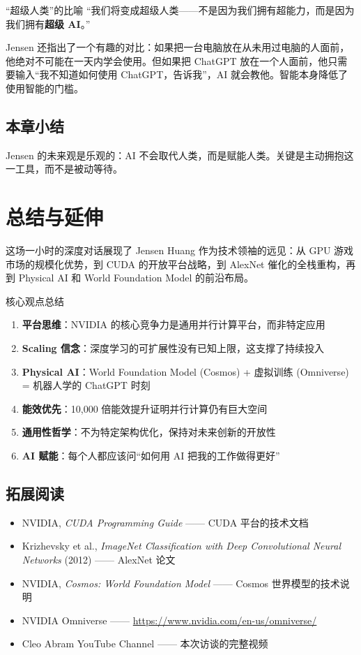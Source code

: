 \documentclass[a4paper]{article}
\begin{document}
\begin{knowledgebox}{``超级人类''的比喻}
``我们将变成超级人类——不是因为我们拥有超能力，而是因为我们拥有\textbf{超级 AI}。''

Jensen 还指出了一个有趣的对比：如果把一台电脑放在从未用过电脑的人面前，他绝对不可能在一天内学会使用。但如果把 ChatGPT 放在一个人面前，他只需要输入``我不知道如何使用 ChatGPT，告诉我''，AI 就会教他。智能本身降低了使用智能的门槛。
\end{knowledgebox}

\subsection{本章小结}
Jensen 的未来观是乐观的：AI 不会取代人类，而是赋能人类。关键是主动拥抱这一工具，而不是被动等待。

\section{总结与延伸}

这场一小时的深度对话展现了 Jensen Huang 作为技术领袖的远见：从 GPU 游戏市场的规模化优势，到 CUDA 的开放平台战略，到 AlexNet 催化的全栈重构，再到 Physical AI 和 World Foundation Model 的前沿布局。

\begin{importantbox}{核心观点总结}
\begin{enumerate}
    \item \textbf{平台思维}：NVIDIA 的核心竞争力是通用并行计算平台，而非特定应用
    \item \textbf{Scaling 信念}：深度学习的可扩展性没有已知上限，这支撑了持续投入
    \item \textbf{Physical AI}：World Foundation Model (Cosmos) + 虚拟训练 (Omniverse) = 机器人学的 ChatGPT 时刻
    \item \textbf{能效优先}：10,000 倍能效提升证明并行计算仍有巨大空间
    \item \textbf{通用性哲学}：不为特定架构优化，保持对未来创新的开放性
    \item \textbf{AI 赋能}：每个人都应该问``如何用 AI 把我的工作做得更好''
\end{enumerate}
\end{importantbox}

\subsection{拓展阅读}
\begin{itemize}
    \item NVIDIA, \textit{CUDA Programming Guide} —— CUDA 平台的技术文档
    \item Krizhevsky et al., \textit{ImageNet Classification with Deep Convolutional Neural Networks} (2012) —— AlexNet 论文
    \item NVIDIA, \textit{Cosmos: World Foundation Model} —— Cosmos 世界模型的技术说明
    \item NVIDIA Omniverse —— \url{https://www.nvidia.com/en-us/omniverse/}
    \item Cleo Abram YouTube Channel —— 本次访谈的完整视频
\end{itemize}

\end{document}
